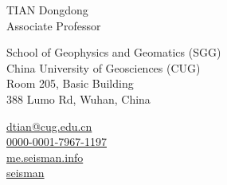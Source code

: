 \documentclass[11pt,a4paper]{article}
\makeatletter
\newcommand{\Name}{TIAN Dongdong}
\newcommand{\CNName}{田冬冬}
\newcommand{\Role}{Associate Professor}
\newcommand{\Email}{dtian@cug.edu.cn}
\newcommand{\Website}{me.seisman.info}
\newcommand{\Github}{seisman}
\newcommand{\Orcid}{0000-0001-7967-1197}
\newcommand{\Affiliation}{School of Geophysics and Geomatics (SGG) \\ China University of Geosciences (CUG)}
\newcommand{\Address}{Room 205, Basic Building \\ 388 Lumo Rd, Wuhan, China}
\makeatother
\begin{document}
\thispagestyle{empty} %
{
\begin{center}
{\fontsize{24pt}{0}\selectfont \Name \hspace{1ex} \kaishu{\CNName}} \\[0.4cm]
{\fontsize{16pt}{0}\selectfont \Role} \\[0.2cm]
\end{center}
\begin{minipage}[t]{0.7\textwidth}
  \fontsize{12pt}{15pt}\selectfont
  \Affiliation
  \\
  \Address
\end{minipage}
\begin{minipage}[t]{0.3\textwidth}
  \fontsize{12pt}{15pt}\selectfont
  \begin{flushleft}
    \faEnvelope \href{mailto:\Email}{\Email}
    \\
    \faOrcid \href{https://orcid.org/\Orcid}{\Orcid}
    \\
    \faGlobe \href{https://\Website}{\Website}
    \\
    \faGithub \href{https://github.com/\Github}{\Github}
  \end{flushleft}
\end{minipage}
}
\vspace{0.2cm}














\end{document}
